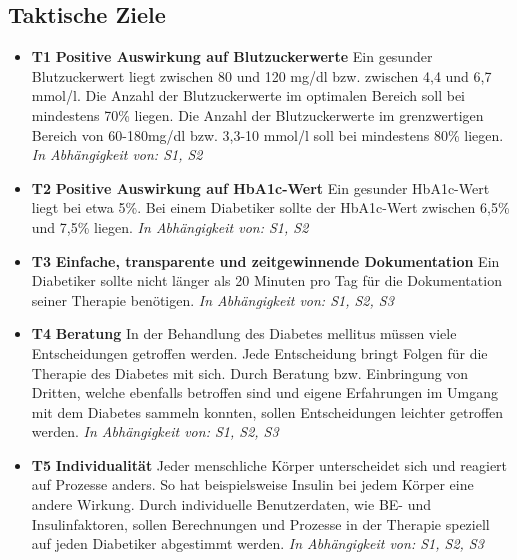 \documentclass[a4paper,11pt]{article}%
\renewcommand{\\}{\vspace*{0.5\baselineskip} \newline}
\begin{document}
\subsection{Taktische Ziele}
\begin{itemize}
	\item \lbrack \textbf{T1}\rbrack  \textbf{ Positive Auswirkung auf Blutzuckerwerte} \\
	Ein gesunder Blutzuckerwert liegt zwischen 80 und 120 mg/dl bzw. zwischen 4,4 und 6,7 mmol/l. Die Anzahl der Blutzuckerwerte im optimalen Bereich soll bei mindestens 70\% liegen. Die Anzahl der Blutzuckerwerte im grenzwertigen Bereich von 60-180mg/dl bzw. 3,3-10 mmol/l soll bei mindestens 80\% liegen.\newline
	\emph{In Abhängigkeit von: S1, S2} \\
	\item \lbrack \textbf{T2}\rbrack  \textbf{ Positive Auswirkung auf HbA1c-Wert} \\
	Ein gesunder HbA1c-Wert liegt bei etwa 5\%. Bei einem Diabetiker sollte der HbA1c-Wert zwischen 6,5\% und 7,5\% liegen. \newline
	\emph{In Abhängigkeit von: S1, S2} \\
	\item \lbrack \textbf{T3}\rbrack  \textbf{ Einfache, transparente und zeitgewinnende Dokumentation} \\
	Ein Diabetiker sollte nicht länger als 20 Minuten pro Tag für die Dokumentation seiner Therapie benötigen.\newline
	\emph{In Abhängigkeit von: S1, S2, S3} \\
	\item \lbrack \textbf{T4}\rbrack  \textbf{ Beratung} \\
	In der Behandlung des Diabetes mellitus müssen viele Entscheidungen getroffen werden. Jede Entscheidung bringt Folgen für die Therapie des Diabetes mit sich. Durch Beratung bzw. Einbringung von Dritten, welche ebenfalls betroffen sind und eigene Erfahrungen im Umgang mit dem Diabetes sammeln konnten, sollen Entscheidungen leichter getroffen werden. \newline
	\emph{In Abhängigkeit von: S1, S2, S3} \\
	\item \lbrack \textbf{T5}\rbrack  \textbf{ Individualität} \\  
	Jeder menschliche Körper unterscheidet sich und reagiert auf Prozesse anders. So hat beispielsweise Insulin bei jedem Körper eine andere Wirkung. Durch individuelle Benutzerdaten, wie BE- und Insulinfaktoren, sollen Berechnungen und Prozesse in der Therapie speziell auf jeden Diabetiker abgestimmt werden. \newline
	\emph{In Abhängigkeit von: S1, S2, S3} \\
	 
\end{itemize}
\end{document}
